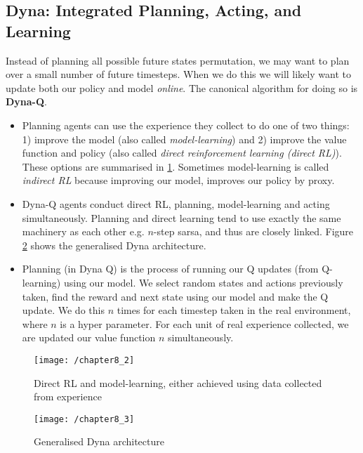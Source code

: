 \subsection{Dyna: Integrated Planning, Acting, and Learning}
Instead of planning all possible future states permutation, we may want to plan over a small number of future timesteps. When we do this we will likely want to update both our policy and model \textit{online}. The canonical algorithm for doing so is \textbf{Dyna-Q}. 
\begin{itemize}
\item Planning agents can use the experience they collect to do one of two things: 1) improve the model (also called \textit{model-learning}) and 2) improve the value function and policy (also called \textit{direct reinforcement learning (direct RL)}). These options are summarised in  \ref{fig: direct rl and model-learning}. Sometimes model-learning is called \textit{indirect RL} because improving our model, improves our policy by proxy.
\item Dyna-Q agents conduct direct RL, planning, model-learning and acting simultaneously. Planning and direct learning tend to use exactly the same machinery as each other e.g. $n$-step sarsa, and thus are closely linked. Figure \ref{fig: dyna} shows the generalised Dyna architecture.
\item Planning (in Dyna Q) is the process of running our Q updates (from Q-learning) using our model. We select random states and actions previously taken, find the reward and next state using our model and make the Q update. We do this $n$ times for each timestep taken in the real environment, where $n$ is a hyper parameter. For each unit of real experience collected, we are updated our value function $n$ simultaneously.
\end{itemize}

\begin{figure}
	\centering
	\texttt{[image: /chapter8\_2]}
	\caption{Direct RL and model-learning, either achieved using data collected from experience}
	\label{fig: direct rl and model-learning}
\end{figure}

\begin{figure}
	\centering
	\texttt{[image: /chapter8\_3]}
	\caption{Generalised Dyna architecture}
	\label{fig: dyna}
\end{figure}

